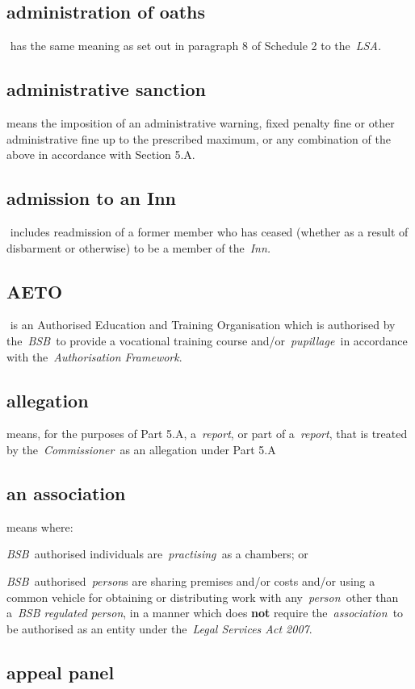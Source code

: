 \subsection{administration of oaths } has the same meaning as set out in
  paragraph 8 of Schedule 2 to the~\emph{LSA.} \subsection{administrative sanction } means the imposition of an
  administrative warning, fixed penalty fine or other administrative
  fine up to the prescribed maximum, or any combination of the above in
  accordance with Section 5.A.  \subsection{admission to an Inn } includes readmission of a former member
  who has ceased (whether as a result of disbarment or otherwise) to be
  a member of the~\emph{Inn.} \subsection{AETO } is an Authorised Education and Training Organisation
  which is authorised by the~\emph{BSB~}to provide a vocational training
  course and/or~\emph{pupillage~}in accordance with
  the~\emph{Authorisation Framework}.  \subsection{allegation }means, for the purposes of Part 5.A,
  a~\emph{report}, or part of a~\emph{report}, that is treated by
  the~\emph{Commissioner}~as an allegation under Part 5.A \subsection{an association } means where:
\al \item \emph{BSB~}authorised
  individuals are~\emph{practising~}as a chambers;  or \item \emph{BSB~}authorised~\emph{person}s are sharing premises
  and/or costs and/or using a common vehicle for obtaining or
  distributing work with any~\emph{person~}other than a~\emph{BSB
  regulated person}, in a manner which does \textbf{not} require
  the~\emph{association~}to be authorised as an entity under
  the~\emph{Legal Services Act 2007}.\la
  
  \subsection{appeal panel }

